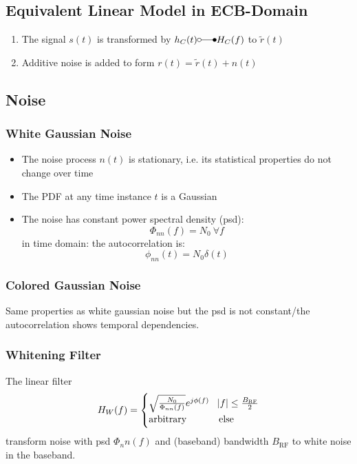 \subsection{Equivalent Linear Model in ECB-Domain}
\begin{enumerate}
    \item The signal $s(t)$ is transformed by $h_C(t) \laplace H_C(f)$ to $\tilde{r}(t)$
    \item Additive noise is added to form $r(t) = \tilde{r}(t) + n(t)$
\end{enumerate}

\subsection{Noise}
\subsubsection{White Gaussian Noise}
\begin{itemize}
    \item The noise process $n(t)$ is stationary, i.e. its statistical properties
        do not change over time
    \item The PDF at any time instance $t$ is a Gaussian
    \item The noise has constant power spectral density (psd):
        \begin{equation}
            \Phi_{nn}(f) = N_0\ \forall f
        \end{equation}
        in time domain: the autocorrelation is:
        \begin{equation}
            \phi_{nn}(t) = N_0 \delta(t)
        \end{equation}
\end{itemize} 

\subsubsection{Colored Gaussian Noise}
Same properties as white gaussian noise but the psd is not constant/the autocorrelation
shows temporal dependencies.

\subsubsection{Whitening Filter}
The linear filter
\begin{equation}
    H_W(f) =
    \begin{cases}
        \sqrt{\frac{N_0}{\Phi_{nn}(f)}} e^{j \phi(f)} & \abs{f} \leq \frac{B_\text{RF}}{2} \\
        \text{arbitrary} & \text{else}
    \end{cases}
\end{equation}
transform noise with psd $\Phi_nn(f)$ and (baseband) bandwidth $B_\text{RF}$ to
white noise in the baseband.

